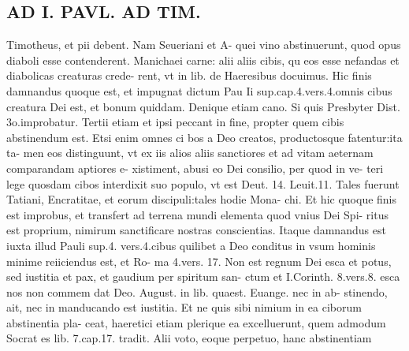 \documentclass{article}
\begin{document}
\begin{pages}
\section*{AD I. PAVL. AD TIM. }
\marginpar{[ p.374 ]}\pstart Timotheus, et pii debent. Nam Seueriani et A- quei vino abstinuerunt, quod opus diaboli esse contenderent. Manichaei carne: alii aliis cibis, qu eos esse nefandas et diabolicas creaturas crede- rent, vt in lib.  de Haeresibus docuimus. Hic finis damnandus quoque est, et impugnat dictum Pau Ii sup.cap.4.vers.4.omnis cibus creatura Dei est, et bonum quiddam. Denique etiam cano. Si quis Presbyter Dist. 3o.improbatur. Tertii etiam et ipsi peccant in fine, propter quem cibis abstinendum est. Etsi enim omnes ci bos a Deo creatos, productosque fatentur:ita ta- men eos distinguunt, vt ex iis alios aliis sanctiores et ad vitam aeternam comparandam aptiores e- xistiment, abusi eo Dei consilio, per quod in ve- teri lege quosdam cibos interdixit suo populo, vt est Deut. 14. Leuit.11. Tales fuerunt Tatiani, Encratitae, et eorum discipuli:tales hodie Mona- chi. Et hic quoque finis est improbus, et transfert ad terrena mundi elementa quod vnius Dei Spi- ritus est proprium, nimirum sanctificare nostras conscientias. Itaque damnandus est iuxta illud Pauli sup.4. vers.4.cibus quilibet a Deo conditus in vsum hominis minime reiiciendus est, et Ro- ma 4.vers. 17. Non est regnum Dei esca et potus, sed iustitia et pax, et gaudium per spiritum san- ctum et I.Corinth. 8.vers.8. esca nos non commem dat Deo. August. in lib.  quaest. Euange. nec in ab- stinendo, ait, nec in manducando est iustitia. Et ne quis sibi nimium in ea ciborum abstinentia pla- ceat, haeretici etiam plerique ea excelluerunt, quem admodum Socrat es lib. 7.cap.17. tradit. Alii voto, eoque perpetuo, hanc abstinentiam  \pend

\end{pages}
\end{document}
